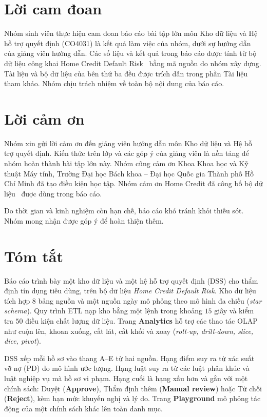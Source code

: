 \fancyfoot[C]{
	\ttfamily
	\thepage
}

\part*{Lời cam đoan}
Nhóm sinh viên thực hiện cam đoan báo cáo bài tập lớn môn Kho dữ liệu và Hệ hỗ trợ quyết định (CO4031) là kết quả làm việc của nhóm, dưới sự hướng dẫn của giảng viên hướng dẫn. Các số liệu và kết quả trong báo cáo được tính từ bộ dữ liệu công khai Home Credit Default Risk~\cite{homecredit2018} bằng mã nguồn do nhóm xây dựng. Tài liệu và bộ dữ liệu của bên thứ ba đều được trích dẫn trong phần Tài liệu tham khảo. Nhóm chịu trách nhiệm về toàn bộ nội dung của báo cáo.

\newpage\part*{Lời cảm ơn}
Nhóm xin gửi lời cảm ơn đến giảng viên hướng dẫn môn Kho dữ liệu và Hệ hỗ trợ quyết định. Kiến thức trên lớp và các góp ý của giảng viên là nền tảng để nhóm hoàn thành bài tập lớn này. Nhóm cũng cảm ơn Khoa Khoa học và Kỹ thuật Máy tính, Trường Đại học Bách khoa -- Đại học Quốc gia Thành phố Hồ Chí Minh đã tạo điều kiện học tập. Nhóm cảm ơn Home Credit đã công bố bộ dữ liệu~\cite{homecredit2018} được dùng trong báo cáo.

Do thời gian và kinh nghiệm còn hạn chế, báo cáo khó tránh khỏi thiếu sót. Nhóm mong nhận được góp ý để hoàn thiện thêm.

\newpage\part*{Tóm tắt}
Báo cáo trình bày một kho dữ liệu và một hệ hỗ trợ quyết định (DSS) cho thẩm định tín dụng tiêu dùng, trên bộ dữ liệu \textit{Home Credit Default Risk}. Kho dữ liệu tích hợp $8$ bảng nguồn và một nguồn ngày mô phỏng theo mô hình đa chiều (\textit{star schema}). Quy trình ETL nạp kho bằng một lệnh trong khoảng $15$ giây và kiểm tra $50$ điều kiện chất lượng dữ liệu. Trang \textbf{Analytics} hỗ trợ các thao tác OLAP như cuộn lên, khoan xuống, cắt lát, cắt khối và xoay (\textit{roll-up, drill-down, slice, dice, pivot}).

\medskip

DSS xếp mỗi hồ sơ vào thang A--E từ hai nguồn. Hạng điểm suy ra từ xác suất vỡ nợ (PD) do mô hình ước lượng. Hạng luật suy ra từ các luật phân khúc và luật nghiệp vụ mà hồ sơ vi phạm. Hạng cuối là hạng xấu hơn và gắn với một chính sách: Duyệt (\textbf{Approve}), Thẩm định thêm (\textbf{Manual review}) hoặc Từ chối (\textbf{Reject}), kèm hạn mức khuyến nghị và lý do. Trang \textbf{Playground} mô phỏng tác động của một chính sách khác lên toàn danh mục.

